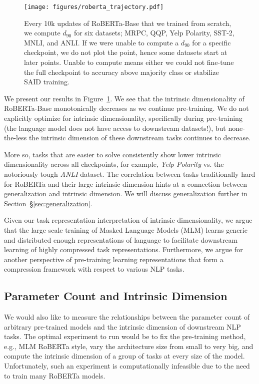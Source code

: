 \documentclass{article} \usepackage{iclr2020_conference,times}
\begin{document}
\begin{figure}
    \centering
    \texttt{[image: figures/roberta\_trajectory.pdf]}
    \caption{Every 10k updates of RoBERTa-Base that we trained from scratch, we compute $d_{90}$ for six datasets; MRPC, QQP, Yelp Polarity, SST-2, MNLI, and ANLI. If we were unable to compute a $d_{90}$ for a specific checkpoint, we do not plot the point, hence some datasets start at later points. Unable to compute means either we could not fine-tune the full checkpoint to accuracy above majority class or stabilize SAID training.}
    \label{fig:roberta_id}
\end{figure}

We present our results in Figure~\ref{fig:roberta_id}. We see that the intrinsic dimensionality of RoBERTa-Base monotonically decreases as we continue pre-training. We do not explicitly optimize for intrinsic dimensionality, specifically during pre-training (the language model does not have access to downstream datasets!), but none-the-less the intrinsic dimension of these downstream tasks continues to decrease.

More so, tasks that are easier to solve consistently show lower intrinsic dimensionality across all checkpoints, for example, \textit{Yelp Polarity} vs. the notoriously tough \textit{ANLI} dataset. The correlation between tasks traditionally hard for RoBERTa and their large intrinsic dimension hints at a connection between generalization and intrinsic dimension. We will discuss generalization further in Section~\S\ref{sec:generalization}.

Given our task representation interpretation of intrinsic dimensionality, we argue that the large scale training of Masked Language Models (MLM) learns generic and distributed enough representations of language to facilitate downstream learning of highly compressed task representations. Furthermore, we argue for another perspective of pre-training learning representations that form a compression framework with respect to various NLP tasks.


\subsection{Parameter Count and Intrinsic Dimension}
\label{section:parameter_exploration}
We would also like to measure the relationships between the parameter count of arbitrary pre-trained models and the intrinsic dimension of downstream NLP tasks. The optimal experiment to run would be to fix the pre-training method, e.g., MLM RoBERTa style, vary the architecture size from small to very big, and compute the intrinsic dimension of a group of tasks at every size of the model. Unfortunately, such an experiment is computationally infeasible due to the need to train many RoBERTa models.
\end{document}
